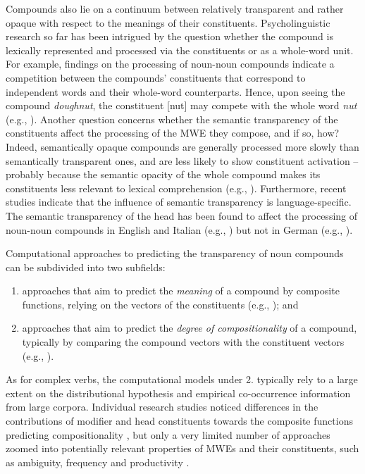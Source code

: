 \documentclass[output=paper]{langsci/langscibook}
\begin{document}
Compounds also lie on a continuum between relatively transparent and
rather opaque with respect to the meanings of their constituents.
Psycholinguistic research so far has been intrigued by the question
whether the compound is lexically represented and processed via the
constituents or as a whole-word unit. For example, findings on the
processing of noun-noun compounds indicate a competition between the
compounds’ constituents that correspond to independent words and their
whole-word counterparts. Hence, upon seeing the compound
\textit{doughnut}, the constituent [nut] may compete with the whole
word \textit{nut} (e.g., \citealt{Libben:06, FrissonEtAl:08,
  MonahanEtAl:08, Fiorentino/FundReznicek:09, Gagne/Spalding:09,
  Gagne/Spalding:14, Libben:14}). Another question concerns whether
the semantic transparency of the constituents affect the processing of
the MWE they compose, and if so, how? Indeed, semantically opaque
compounds are generally processed more slowly than semantically
transparent ones, and are less likely to show constituent activation –
probably because the semantic opacity of the whole compound makes its
constituents less relevant to lexical comprehension (e.g.,
\citealt{Taft/Forster:76, Sandra:94, Zwitserlood:94, IselEtAl:03,
  LibbenEtAl:03}). Furthermore, recent studies indicate that the
influence of semantic transparency is language-specific. The semantic
transparency of the head has been found to affect the processing of
noun-noun compounds in English and Italian (e.g.,
\citealt{MarelliEtAl:09, Marelli/Luzzatti:12}) but not in German (e.g.,
\citealt{Smolka/Libben:17}).

Computational approaches to predicting the transparency of noun
compounds can be subdivided into two subfields:
\begin{enumerate}
\item approaches that
aim to predict the \textit{meaning} of a compound by composite
functions, relying on the vectors of the constituents (e.g.,
\citealt{Mitchell/Lapata:10,CoeckeEtAl:11,BaroniEtAl:14b,Hermann:14}); and
\item approaches that aim to predict the \textit{degree of
  compositionality} of a compound, typically by comparing the compound
vectors with the constituent vectors (e.g.,
\citealt{ReddyEtAl:11a,Salehi/Cook:13,SchulteImWaldeEtAl:13,SalehiEtAl:14,SalehiEtAl:14b,SalehiEtAl:15,SchulteImWaldeEtAl:16b,Koeper/SchulteImWalde:17b}).
\end{enumerate}

As for complex verbs, the computational models under 2. typically rely to a large
extent on the distributional hypothesis and empirical co-occurrence
information from large corpora. Individual research studies noticed
differences in the contributions of modifier and head constituents
towards the composite functions predicting compositionality
\citep{ReddyEtAl:11a,SchulteImWaldeEtAl:13}, but only a very limited
number of approaches zoomed into potentially relevant properties of
MWEs and their constituents, such as ambiguity, frequency and
productivity \citep{Bell/Schaefer:16,SchulteImWaldeEtAl:16b}.
\end{document}
